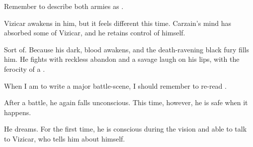 \begin{garbage}
Remember to describe both armies as .

Vizicar awakens in him, but it feels different this time. Carzain's mind has absorbed some of Vizicar, and he retains control of himself. 

Sort of. Because his dark, \draconic{} blood awakens, and the death-ravening black fury fills him. He fights with reckless abandon and a savage laugh on his lips, with the ferocity of a \dragon{}. 

When I am to write a major battle-scene, I should remember to re-read . 

After a battle, he again falls unconscious. This time, however, he is safe when it happens. 

He dreams. For the first time, he is conscious during the vision and able to talk to Vizicar, who tells him about himself. 


\end{garbage}
